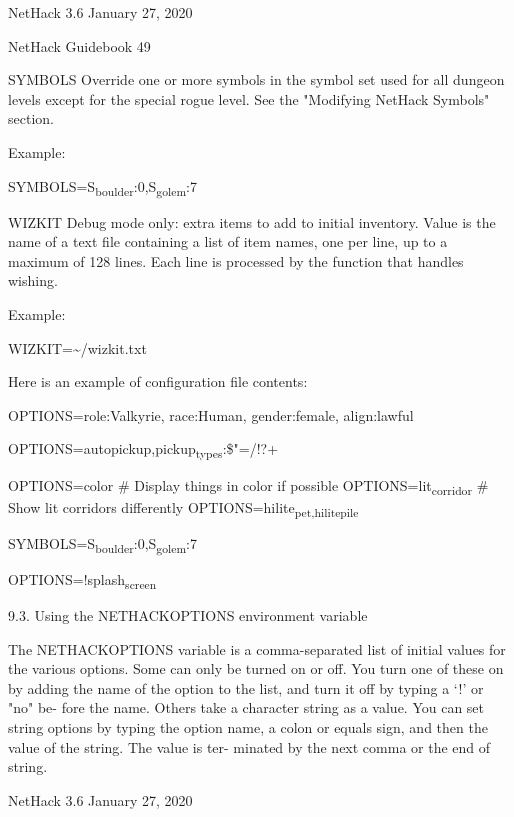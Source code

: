 \documentclass[11pt]{article}
\begin{document}
NetHack 3.6                   January 27, 2020





NetHack Guidebook                       49



SYMBOLS
 Override one or more symbols in the symbol set used for all
 dungeon levels except for the special rogue level.  See the
 "Modifying NetHack Symbols" section.

Example:

SYMBOLS=S\textsubscript{boulder}:0,S\textsubscript{golem}:7

WIZKIT
 Debug mode only:  extra items to add to initial inventory.
 Value is the name of a text file containing a list of item
 names, one per line, up to a maximum of 128 lines. Each line
 is processed by the function that handles wishing.

Example:

WIZKIT=\textasciitilde{}/wizkit.txt



Here is an example of configuration file contents:

OPTIONS=role:Valkyrie, race:Human, gender:female, align:lawful

OPTIONS=autopickup,pickup\textsubscript{types}:\$"=/!?+

OPTIONS=color      \# Display things in color if possible
OPTIONS=lit\textsubscript{corridor}  \# Show lit corridors differently
OPTIONS=hilite\textsubscript{pet,hilite}\textsubscript{pile}

SYMBOLS=S\textsubscript{boulder}:0,S\textsubscript{golem}:7

OPTIONS=!splash\textsubscript{screen}



9.3. Using the NETHACKOPTIONS environment variable

   The NETHACKOPTIONS variable is a comma-separated list of
initial values for the various options. Some can only be turned
on or off. You turn one of these on by adding the name of the
option to the list, and turn it off by typing a `!' or "no" be-
fore the name. Others take a character string as a value.  You
can set string options by typing the option name, a colon or
equals sign, and then the value of the string. The value is ter-
minated by the next comma or the end of string.




NetHack 3.6                   January 27, 2020
\end{document}

